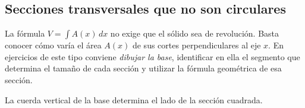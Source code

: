 \documentclass[12pt]{article}
\theoremstyle{definition}
\theoremstyle{remark}
\begin{document}
\subsection*{Secciones transversales que no son circulares}
La fórmula $V=\int A(x)\,dx$ no exige que el sólido sea de revolución. Basta conocer cómo varía el área $A(x)$ de sus cortes perpendiculares al eje $x$. En ejercicios de este tipo conviene \emph{dibujar la base}, identificar en ella el segmento que determina el tamaño de cada sección y utilizar la fórmula geométrica de esa sección.

\begin{center}

{\small La cuerda vertical de la base determina el lado de la sección cuadrada.}
\end{center}
\end{document}
